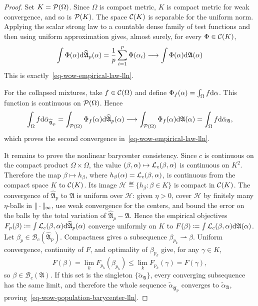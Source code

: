 \begin{proof}
	Set $K=\mathcal{P}(\Omega)$. Since $\Omega$ is compact metric, $K$ is compact metric for weak convergence, and so is $\mathcal{P}(K)$. The space $\mathcal{C}(K)$ is separable for the uniform norm. Applying the scalar strong law to a countable dense family of test functions and then using uniform approximation gives, almost surely, for every $\Phi\in\mathcal{C}(K)$,
	\[
		\int \Phi(\alpha)\mathrm{d}\widehat{\mathfrak A}_p(\alpha)
		=
		\frac1p\sum_{i=1}^p\Phi(\alpha_i)
		\longrightarrow
		\int \Phi(\alpha)\mathrm{d}\mathfrak A(\alpha)
	\]
	This is exactly~\eqref{eq-wow-empirical-law-lln}.

	For the collapsed mixtures, take $f\in\mathcal{C}(\Omega)$ and define $\Phi_f(\alpha)=\int_\Omega f\mathrm{d}\alpha$. This function is continuous on $\mathcal{P}(\Omega)$. Hence
	\[
		\int_\Omega f\mathrm{d}\bar\alpha_{\widehat{\mathfrak A}_p}
		=
		\int_{\mathcal{P}(\Omega)}\Phi_f(\alpha)\mathrm{d}\widehat{\mathfrak A}_p(\alpha)
		\longrightarrow
		\int_{\mathcal{P}(\Omega)}\Phi_f(\alpha)\mathrm{d}\mathfrak A(\alpha)
		=
		\int_\Omega f\mathrm{d}\bar\alpha_{\mathfrak A},
	\]
		which proves the second convergence in~\eqref{eq-wow-empirical-law-lln}.

	It remains to prove the nonlinear barycenter consistency. Since $c$ is continuous on the compact product $\Omega\times\Omega$, the value $(\beta,\alpha)\mapsto\mathcal{L}_c(\beta,\alpha)$ is continuous on $K^2$. Therefore the map $\beta\mapsto h_\beta$, where $h_\beta(\alpha)=\mathcal{L}_c(\beta,\alpha)$, is continuous from the compact space $K$ to $\mathcal{C}(K)$. Its image
	\(\mathcal H \eqdef \{h_\beta:\beta\in K\}\)
	is compact in $\mathcal{C}(K)$. The convergence of $\widehat{\mathfrak A}_p$ to $\mathfrak A$ is uniform over $\mathcal H$: given $\eta>0$, cover $\mathcal H$ by finitely many $\eta$-balls in $|\!| \cdot |\!|_\infty$, use weak convergence for the centers, and bound the error on the balls by the total variation of $\widehat{\mathfrak A}_p-\mathfrak A$. Hence the empirical objectives
	$F_p(\beta)\coloneqq\int\mathcal{L}_c(\beta,\alpha)\mathrm{d}\widehat{\mathfrak A}_p(\alpha)$
	converge uniformly on $K$ to
	$F(\beta)\coloneqq\int\mathcal{L}_c(\beta,\alpha)\mathrm{d}\mathfrak A(\alpha)$.
	Let $\beta_p\in\mathcal B_c(\widehat{\mathfrak A}_p)$. Compactness gives a subsequence $\beta_{p_k}\rightharpoonup\beta$. Uniform convergence, continuity of $F$, and optimality of $\beta_{p_k}$ give, for any $\gamma\in K$,
	\[
		F(\beta)
		=
		\lim_k F_{p_k}(\beta_{p_k})
		\leq
		\lim_k F_{p_k}(\gamma)
		=
		F(\gamma),
	\]
	so $\beta\in\mathcal B_c(\mathfrak A)$. If this set is the singleton $\{\widetilde\alpha_{\mathfrak A}\}$, every converging subsequence has the same limit, and therefore the whole sequence $\widetilde\alpha_{\widehat{\mathfrak A}_p}$ converges to $\widetilde\alpha_{\mathfrak A}$, proving~\eqref{eq-wow-population-barycenter-lln}.
\end{proof}


